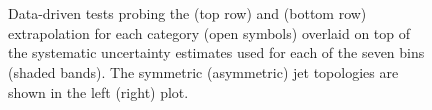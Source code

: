 \begin{figure}[h!]
  \begin{center}
    ~~
    \\
    ~~

    \caption{Data-driven tests probing the \alphat (top row) and \bdphi (bottom row) extrapolation for each
      \njet category (open symbols) overlaid on top of the systematic
      uncertainty estimates used for each of the seven \scalht bins (shaded bands). 
      The symmetric (asymmetric) jet topologies are shown in the left (right) plot. 
    }
    \label{fig:closureAlphaT}
  \end{center} 
\end{figure}



